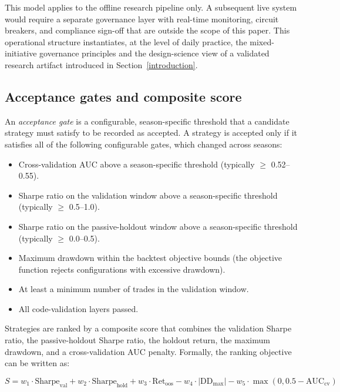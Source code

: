 \documentclass[analytics,article,submit,pdftex,moreauthors]{Definitions/mdpi}
\begin{document}
This model applies to the offline research pipeline only. A subsequent live system would require a separate governance layer with real-time monitoring, circuit breakers, and compliance sign-off that are outside the scope of this paper. This operational structure instantiates, at the level of daily practice, the mixed-initiative governance principles \citep{horvitz_1999, amershi_2019} and the design-science view of a validated research artifact \citep{hevner_2004} introduced in Section~\ref{introduction}.

\subsection{Acceptance gates and composite score}\label{acceptance-gates-and-composite-score}

\begin{Definition}\label{def:acceptance-gate}
An \emph{acceptance gate} is a configurable, season-specific threshold that a candidate strategy must satisfy to be recorded as accepted. A strategy is accepted only if it satisfies all of the following configurable gates, which changed across seasons:

\begin{itemize}
\item
  Cross-validation AUC above a season-specific threshold (typically $\geq$ 0.52--0.55).
\item
  Sharpe ratio on the validation window above a season-specific threshold (typically $\geq$ 0.5--1.0).
\item
  Sharpe ratio on the passive-holdout window above a season-specific threshold (typically $\geq$ 0.0--0.5).
\item
  Maximum drawdown within the backtest objective bounds (the objective function rejects configurations with excessive drawdown).
\item
  At least a minimum number of trades in the validation window.
\item
  All code-validation layers passed.
\end{itemize}
\end{Definition}

Strategies are ranked by a composite score that combines the validation Sharpe ratio, the passive-holdout Sharpe ratio, the holdout return, the maximum drawdown, and a cross-validation AUC penalty. Formally, the ranking objective can be written as:

\[S = w_1 \cdot \text{Sharpe}_{\text{val}} + w_2 \cdot \text{Sharpe}_{\text{hold}} + w_3 \cdot \text{Ret}_{\text{oos}} - w_4 \cdot |\text{DD}_{\text{max}}| - w_5 \cdot \max(0, 0.5 - \text{AUC}_{\text{cv}})\]
\end{document}

